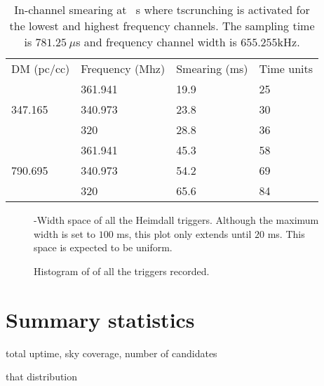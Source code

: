 \begin{table}
	\label{tab:dmsmearing}
	\caption{In-channel smearing at \dm~s where tscrunching is activated for the lowest and highest frequency channels. The sampling time is $781.25\ \mu$s and frequency channel width is $655.255$kHz.}
		\begin{tabular}{llll}
			DM (pc/cc)               & Frequency (Mhz) & Smearing (ms) & Time units \\
			\multirow{3}{*}{347.165} & 361.941         & 19.9          & 25         \\
															 & 340.973         & 23.8          & 30         \\
															 & 320             & 28.8          & 36         \\
			\multirow{3}{*}{790.695} & 361.941         & 45.3          & 58         \\
															 & 340.973         & 54.2          & 69         \\
															 & 320             & 65.6          & 84        
		\end{tabular}
\end{table}

\begin{figure}
	\label{fig:triheimdall}
	\caption{\dm-Width space of all the Heimdall triggers. Although the maximum width is set to $100$ ms, this plot only extends until $20$ ms.
		This space is expected to be uniform.
	}
\end{figure}

\begin{figure}
	\label{fig:histdm}
	\caption{Histogram of \dm of all the triggers recorded.}
\end{figure}


\section{Summary statistics}
\par total uptime, sky coverage, number of candidates
\par that distribution


